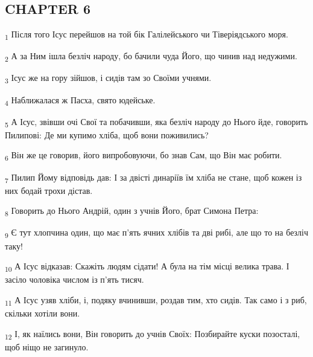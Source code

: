 \subsection{CHAPTER 6}
\begin{tcolorbox}
\textsubscript{1} Після того Ісус перейшов на той бік Галілейського чи Тіверіядського моря.
\end{tcolorbox}
\begin{tcolorbox}
\textsubscript{2} А за Ним ішла безліч народу, бо бачили чуда Його, що чинив над недужими.
\end{tcolorbox}
\begin{tcolorbox}
\textsubscript{3} Ісус же на гору зійшов, і сидів там зо Своїми учнями.
\end{tcolorbox}
\begin{tcolorbox}
\textsubscript{4} Наближалася ж Пасха, свято юдейське.
\end{tcolorbox}
\begin{tcolorbox}
\textsubscript{5} А Ісус, звівши очі Свої та побачивши, яка безліч народу до Нього йде, говорить Пилипові: Де ми купимо хліба, щоб вони поживились?
\end{tcolorbox}
\begin{tcolorbox}
\textsubscript{6} Він же це говорив, його випробовуючи, бо знав Сам, що Він має робити.
\end{tcolorbox}
\begin{tcolorbox}
\textsubscript{7} Пилип Йому відповідь дав: І за двісті динаріїв їм хліба не стане, щоб кожен із них бодай трохи дістав.
\end{tcolorbox}
\begin{tcolorbox}
\textsubscript{8} Говорить до Нього Андрій, один з учнів Його, брат Симона Петра:
\end{tcolorbox}
\begin{tcolorbox}
\textsubscript{9} Є тут хлопчина один, що має п'ять ячних хлібів та дві рибі, але що то на безліч таку!
\end{tcolorbox}
\begin{tcolorbox}
\textsubscript{10} А Ісус відказав: Скажіть людям сідати! А була на тім місці велика трава. І засіло чоловіка числом із п'ять тисяч.
\end{tcolorbox}
\begin{tcolorbox}
\textsubscript{11} А Ісус узяв хліби, і, подяку вчинивши, роздав тим, хто сидів. Так само і з риб, скільки хотіли вони.
\end{tcolorbox}
\begin{tcolorbox}
\textsubscript{12} І, як наїлись вони, Він говорить до учнів Своїх: Позбирайте куски позосталі, щоб ніщо не загинуло.
\end{tcolorbox}

